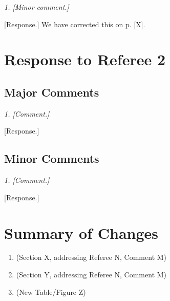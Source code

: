 \documentclass[12pt]{article}
\newcommand{\refcomment}[1]{%
    \medskip\noindent
    \textit{\color{refcomment}#1}%
    \medskip
}
\begin{document}
\refcomment{1. [Minor comment.]}

[Response.] We have corrected this on p. [X].


\section*{Response to Referee 2}

\subsection*{Major Comments}

\refcomment{1. [Comment.]}

[Response.]

\subsection*{Minor Comments}

\refcomment{1. [Comment.]}

[Response.]


\section*{Summary of Changes}

\begin{enumerate}
    \item [Change 1] (Section X, addressing Referee N, Comment M)
    \item [Change 2] (Section Y, addressing Referee N, Comment M)
    \item [Change 3] (New Table/Figure Z)
\end{enumerate}
\end{document}
